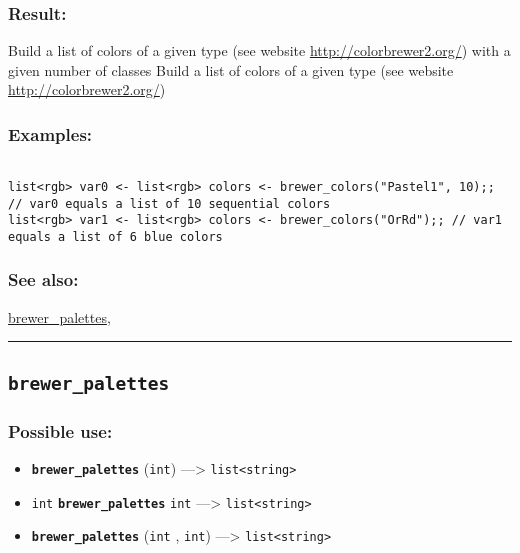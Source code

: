 \documentclass[]{book}
\providecommand{\tightlist}{%
  \setlength{\itemsep}{0pt}\setlength{\parskip}{0pt}}
\theoremstyle{definition}
\theoremstyle{definition}
\theoremstyle{definition}
\theoremstyle{remark}
\begin{document}
\subsubsection{Result:}\label{result-76}

Build a list of colors of a given type (see website
\url{http://colorbrewer2.org/}) with a given number of classes Build a
list of colors of a given type (see website
\url{http://colorbrewer2.org/})

\subsubsection{Examples:}\label{examples-59}

\begin{verbatim}
 
list<rgb> var0 <- list<rgb> colors <- brewer_colors("Pastel1", 10);; // var0 equals a list of 10 sequential colors 
list<rgb> var1 <- list<rgb> colors <- brewer_colors("OrRd");; // var1 equals a list of 6 blue colors
\end{verbatim}

\subsubsection{See also:}\label{see-also-48}

\href{OperatorsBC\#brewer_palettes}{brewer\_palettes},

\begin{center}\rule{0.5\linewidth}{\linethickness}\end{center}

\subsection{\texorpdfstring{\texttt{brewer\_palettes}}{brewer\_palettes}}\label{brewer_palettes}

\subsubsection{Possible use:}\label{possible-use-78}

\begin{itemize}
\tightlist
\item
  \textbf{\texttt{brewer\_palettes}} (\texttt{int}) ---\textgreater{}
  \texttt{list\textless{}string\textgreater{}}
\item
  \texttt{int} \textbf{\texttt{brewer\_palettes}} \texttt{int}
  ---\textgreater{} \texttt{list\textless{}string\textgreater{}}
\item
  \textbf{\texttt{brewer\_palettes}} (\texttt{int} , \texttt{int})
  ---\textgreater{} \texttt{list\textless{}string\textgreater{}}
\end{itemize}
\end{document}
